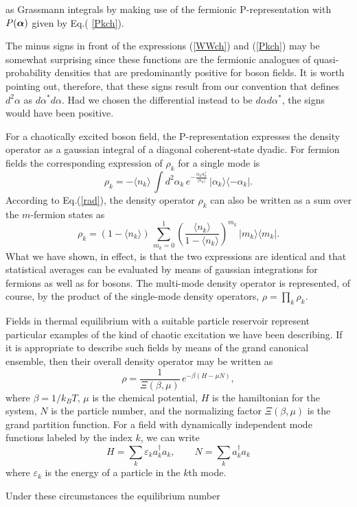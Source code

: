 \documentclass[12pt]{article}
\def\beq{\begin{equation}}
\def\eeq{\end{equation}}
\def\a{\alpha}
\def\ba{{\mbox{\boldmath$\alpha$}}}
\def\sa{\alpha^*}
\def\ad{a^\dgr}
\def\b{\beta}
\def\e{\varepsilon}
\def\dgr{\dagger}
\def\co_st{coherent-state}
\def\dop{density operator }
\def\dopsp{density operators}
\begin{document}
as Grassmann integrals by making use of the fermionic
P-representation with $ P( \ba ) $ given by Eq.( \ref {Pkch}). 
\par
The minus signs in front of the expressions (\ref {WWch}) and
(\ref {Pkch}) may be somewhat surprising since 
these functions are the fermionic
analogues of quasi-probability densities that are predominantly positive 
for boson fields.
It is worth pointing out, therefore,
that these signs result from our convention
that defines $ d^2\a $ as $ d\sa d\a $.
Had we chosen the differential instead to be $ d\a d\sa $,
the signs would have been positive. 
\par
For a chaotically excited boson field, the P-representation
expresses the \dop as a gaussian integral of a diagonal
\co_st dyadic.  For fermion fields the corresponding
expression of $ \rho_k $ for a single mode is
\beq
\rho_k = - \langle n_k \rangle \,
\int \! d^2 \a_k \, e^ { - \frac{ \a_k \sa_k }{ \langle n_k \rangle } }
\, | \a_k \rangle \langle - \a_k | .
\label {rhochPk}
\eeq
According to Eq.(\ref {rad}),
the \dop $ \rho_k $ can also be written as a sum
over the $m$-fermion states as 
\beq
\rho_k = ( 1 - \langle n_k \rangle ) \,
\sum_{m_k=0}^1 \left( \frac{ \langle n_k \rangle }{ 1 - \langle n_k \rangle }
\right) ^ { m_k } \, | m_k \rangle \langle m_k | .
\label {rhochmk}
\eeq
What we have shown, in effect, is that the two expressions
are identical and that statistical averages 
can be evaluated by means of gaussian integrations
for fermions as well as for bosons.
The multi-mode \dop is represented, of course,
by the product of the single-mode \dopsp,
$ \rho = \prod_k \rho_k $.
\par
Fields in thermal equilibrium with a suitable
particle reservoir represent particular examples
of the kind of chaotic excitation we have been describing.  
If it is appropriate to describe such fields
by means of the grand canonical ensemble,
then their overall \dop may be written as
\beq
\rho = \frac { 1 }{ \Xi( \b , \mu ) }
\, e^ { - \beta ( H - \mu N ) } ,
\label {GCE}
\eeq
where $ \beta = 1/ k_B T $, $ \mu $ is the chemical 
potential, $ H $ is the hamiltonian for the system,
$ N $ is the particle number, and the normalizing factor
$ \Xi( \b , \mu ) $ is the grand partition function.
For a field with dynamically independent mode functions
labeled by the index $ k $, we can write 
\beq
H = \sum_k \e_k \ad_k a_k , \qquad N = \sum_k \ad_k a_k
\label {HN}
\eeq
where $ \e_k $ is the energy of a particle in the $ k $th mode.
\par
Under these circumstances the equilibrium number 
\end{document}
